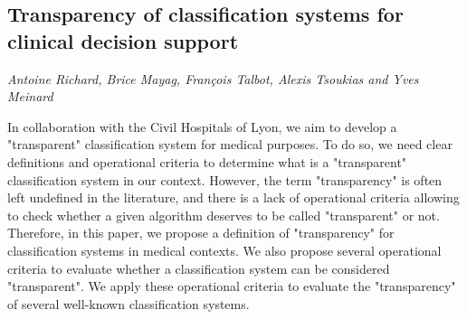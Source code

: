 \documentclass[../booklet.tex]{subfiles}
\begin{document}
\subsection[Transparency of classification systems for clinical decision support. {\it Antoine Richard, Brice Mayag, François Talbot, Alexis Tsoukias and Yves Meinard}]{Transparency of classification systems for clinical decision support}
    

\begin{center}
  {\it Antoine Richard, Brice Mayag, François Talbot, Alexis Tsoukias and Yves Meinard}
\end{center}

\vskip 0.8cm


  In collaboration with the Civil Hospitals of Lyon, we aim
to develop a "transparent" classification system for medical purposes.
To do so, we need clear definitions and operational criteria to determine
what is a "transparent" classification system in our context.
However, the term "transparency" is often left undefined
in the literature, and there is a lack of operational criteria
allowing to check whether a given algorithm deserves to be called
"transparent" or not.
Therefore, in this paper, we propose a definition of "transparency"
for classification systems in medical contexts.
We also propose several operational criteria to evaluate
whether a classification system can be considered 
"transparent".
We apply these operational criteria to evaluate the 
"transparency" of several well-known classification systems.
\end{document}
